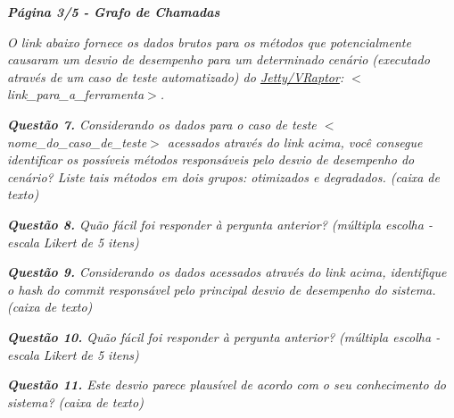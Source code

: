 \begin{framed}
	\noindent \textit{\textbf{Página 3/5 - Grafo de Chamadas}}
	\par
	\noindent \textit{O link abaixo fornece os dados brutos para os métodos que potencialmente causaram um desvio de desempenho para um determinado cenário (executado através de um caso de teste automatizado) do \underline{Jetty/VRaptor}: {\(<\)}link\_para\_a\_ferramenta{\(>\)}.}
	
	\noindent \textit{\textbf{Questão 7.} Considerando os dados para o caso de teste {\(<\)}nome\_do\_caso\_de\_teste{\(>\)} acessados através do link acima, você consegue identificar os possíveis métodos responsáveis pelo desvio de desempenho do cenário? Liste tais métodos em dois grupos: otimizados e degradados. (caixa de texto)}
	\par
	\noindent \textit{\textbf{Questão 8.} Quão fácil foi responder à pergunta anterior? (múltipla escolha - escala Likert de 5 itens)}
	\par
	\noindent \textit{\textbf{Questão 9.} Considerando os dados acessados através do link acima, identifique o hash do commit responsável pelo principal desvio de desempenho do sistema. (caixa de texto)}
	\par
	\noindent \textit{\textbf{Questão 10.} Quão fácil foi responder à pergunta anterior? (múltipla escolha - escala Likert de 5 itens)}
	\par
	\noindent \textit{\textbf{Questão 11.} Este desvio parece plausível de acordo com o seu conhecimento do sistema? (caixa de texto)}
\end{framed}

